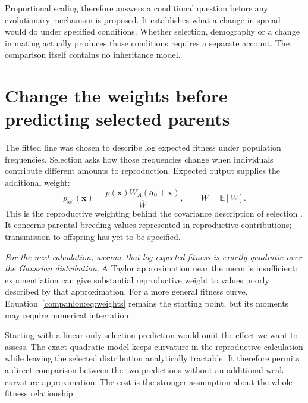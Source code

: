 Proportional scaling therefore answers a conditional question before any
evolutionary mechanism is proposed. It establishes what a change in spread
would do under specified conditions. Whether selection, demography or a
change in mating actually produces those conditions requires a separate
account. The comparison itself contains no inheritance model.

\section{Change the weights before predicting selected parents}
\label{companion:selection}

The fitted line was chosen to describe log expected fitness under population
frequencies. Selection asks how those frequencies change when individuals
contribute different amounts to reproduction. Expected output supplies the
additional weight:
\begin{equation}
 p_{\mathrm{sel}}(\mathbf x)
 =\frac{p(\mathbf x)W_A(\mathbf a_0+\mathbf x)}{\overline W},
 \qquad
 \overline W=\mathbb E[W].
 \label{companion:eq:weights}
\end{equation}
This is the reproductive weighting behind the covariance description of
selection \citep{Price1970}. It concerns parental breeding values represented
in reproductive contributions; transmission to offspring has yet to be
specified.

\emph{For the next calculation, assume that log expected fitness is exactly
quadratic over the Gaussian distribution.} A Taylor approximation near the
mean is insufficient: exponentiation can give substantial reproductive
weight to values poorly described by that approximation. For a more general
fitness curve, Equation~\eqref{companion:eq:weights} remains the starting
point, but its moments may require numerical integration.

Starting with a linear-only selection prediction would omit the effect we
want to assess. The exact quadratic model keeps curvature in the
reproductive calculation while leaving the selected distribution
analytically tractable. It therefore permits a direct comparison between
the two predictions without an additional weak-curvature approximation.
The cost is the stronger assumption about the whole fitness relationship.

